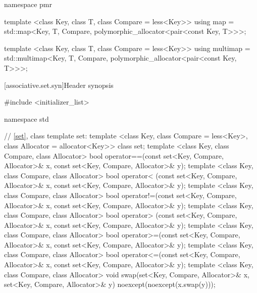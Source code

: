 \begin{codeblock}
{  namespace pmr {
    template <class Key, class T, class Compare = less<Key>>
      using map = std::map<Key, T, Compare,
                           polymorphic_allocator<pair<const Key, T>>>;

    template <class Key, class T, class Compare = less<Key>>
      using multimap = std::multimap<Key, T, Compare,
                                     polymorphic_allocator<pair<const Key, T>>>;
  }
}
\end{codeblock}

[associative.set.syn]{Header  synopsis}%

\begin{codeblock}
#include <initializer_list>

namespace std {
  // \ref{set}, class template set:
  template <class Key, class Compare = less<Key>,
            class Allocator = allocator<Key>>
    class set;
  template <class Key, class Compare, class Allocator>
    bool operator==(const set<Key, Compare, Allocator>& x,
                    const set<Key, Compare, Allocator>& y);
  template <class Key, class Compare, class Allocator>
    bool operator< (const set<Key, Compare, Allocator>& x,
                    const set<Key, Compare, Allocator>& y);
  template <class Key, class Compare, class Allocator>
    bool operator!=(const set<Key, Compare, Allocator>& x,
                    const set<Key, Compare, Allocator>& y);
  template <class Key, class Compare, class Allocator>
    bool operator> (const set<Key, Compare, Allocator>& x,
                    const set<Key, Compare, Allocator>& y);
  template <class Key, class Compare, class Allocator>
    bool operator>=(const set<Key, Compare, Allocator>& x,
                    const set<Key, Compare, Allocator>& y);
  template <class Key, class Compare, class Allocator>
    bool operator<=(const set<Key, Compare, Allocator>& x,
                    const set<Key, Compare, Allocator>& y);
  template <class Key, class Compare, class Allocator>
    void swap(set<Key, Compare, Allocator>& x,
              set<Key, Compare, Allocator>& y)
      noexcept(noexcept(x.swap(y)));

}
\end{codeblock}
